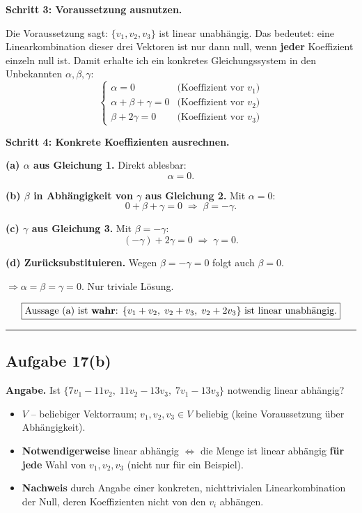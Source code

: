 \documentclass[a4paper,12pt]{article}
\begin{document}
\textbf{Schritt 3: Voraussetzung ausnutzen.}

Die Voraussetzung sagt: $\{v_1, v_2, v_3\}$ ist linear unabh\"angig. Das bedeutet:
eine Linearkombination dieser drei Vektoren ist nur dann null, wenn \textbf{jeder} Koeffizient einzeln
null ist. Damit erhalte ich ein konkretes Gleichungssystem in den Unbekannten $\alpha, \beta, \gamma$:
\[
\begin{cases}
\alpha = 0 & \text{(Koeffizient vor $v_1$)} \\
\alpha + \beta + \gamma = 0 & \text{(Koeffizient vor $v_2$)} \\
\beta + 2\gamma = 0 & \text{(Koeffizient vor $v_3$)}
\end{cases}
\]

\textbf{Schritt 4: Konkrete Koeffizienten ausrechnen.}

\textbf{(a) $\alpha$ aus Gleichung 1.} Direkt ablesbar:
\[
\alpha = 0.
\]

\textbf{(b) $\beta$ in Abh\"angigkeit von $\gamma$ aus Gleichung 2.} Mit $\alpha = 0$:
\[
0 + \beta + \gamma = 0 \;\Rightarrow\; \beta = -\gamma.
\]

\textbf{(c) $\gamma$ aus Gleichung 3.} Mit $\beta = -\gamma$:
\[
(-\gamma) + 2\gamma = 0 \;\Rightarrow\; \gamma = 0.
\]

\textbf{(d) Zur\"ucksubstituieren.} Wegen $\beta = -\gamma = 0$ folgt auch $\beta = 0$.

$\Rightarrow \alpha = \beta = \gamma = 0$. Nur triviale L\"osung.

\[
\fbox{\parbox{0.93\textwidth}{\centering
Aussage (a) ist \textbf{wahr}: $\{v_1+v_2,\; v_2+v_3,\; v_2+2v_3\}$ ist linear unabh\"angig.
}}
\]

\bigskip
\hrule
\bigskip

\subsection*{Aufgabe 17(b)}

\textbf{Angabe.} Ist $\{7v_1 - 11v_2,\; 11v_2 - 13v_3,\; 7v_1 - 13v_3\}$ notwendig linear abh\"angig?

\begin{begriffe}
\begin{itemize}[leftmargin=*, nosep]
    \item $V$ -- beliebiger Vektorraum; $v_1, v_2, v_3 \in V$ beliebig (keine Voraussetzung \"uber Abh\"angigkeit).
    \item \textbf{Notwendigerweise} linear abh\"angig $\iff$ die Menge ist linear abh\"angig \textbf{f\"ur jede} Wahl von $v_1, v_2, v_3$ (nicht nur f\"ur ein Beispiel).
    \item \textbf{Nachweis} durch Angabe einer konkreten, nichttrivialen Linearkombination der Null, deren Koeffizienten nicht von den $v_i$ abh\"angen.
\end{itemize}
\end{begriffe}
\end{document}
